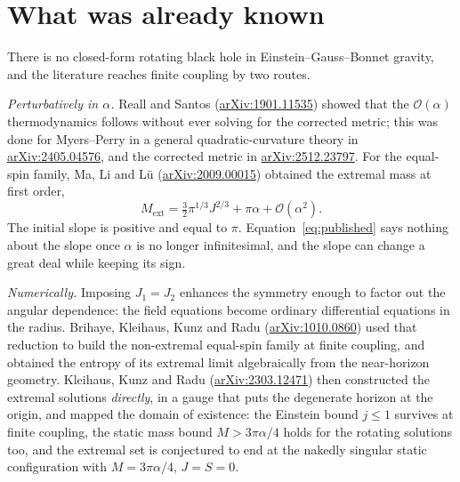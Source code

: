 \documentclass[10pt,a4paper]{article}
\newcommand{\ext}{\mathrm{ext}}
\newcommand{\aX}[1]{\href{https://arxiv.org/abs/#1}{arXiv:#1}}
\begin{document}
\section*{What was already known}

There is no closed-form rotating black hole in Einstein--Gauss--Bonnet gravity,
and the literature reaches finite coupling by two routes.

\emph{Perturbatively in $\alpha$.} Reall and Santos (\aX{1901.11535}) showed
that the $\mathcal O(\alpha)$ thermodynamics follows without ever solving for
the corrected metric; this was done for Myers--Perry in a general
quadratic-curvature theory in \aX{2405.04576}, and the corrected metric in
\aX{2512.23797}. For the equal-spin family, Ma, Li and L\"u (\aX{2009.00015})
obtained the extremal mass at first order,
\begin{equation}
 M_\ext=\tfrac32\pi^{1/3}J^{2/3}+\pi\alpha+\mathcal O(\alpha^2).
 \label{eq:published}
\end{equation}
The initial slope is positive and equal to $\pi$. Equation~\eqref{eq:published}
says nothing about the slope once $\alpha$ is no longer infinitesimal, and the
slope can change a great deal while keeping its sign.

\emph{Numerically.} Imposing $J_1=J_2$ enhances the symmetry enough to factor
out the angular dependence: the field equations become ordinary differential
equations in the radius. Brihaye, Kleihaus, Kunz and Radu (\aX{1010.0860}) used
that reduction to build the non-extremal equal-spin family at finite coupling,
and obtained the entropy of its extremal limit algebraically from the
near-horizon geometry. Kleihaus, Kunz and Radu (\aX{2303.12471}) then
constructed the extremal solutions \emph{directly}, in a gauge that puts the
degenerate horizon at the origin, and mapped the domain of existence: the
Einstein bound $j\le1$ survives at finite coupling, the static mass bound
$M>3\pi\alpha/4$ holds for the rotating solutions too, and the extremal set is
conjectured to end at the nakedly singular static configuration with
$M=3\pi\alpha/4$, $J=S=0$.
\end{document}
